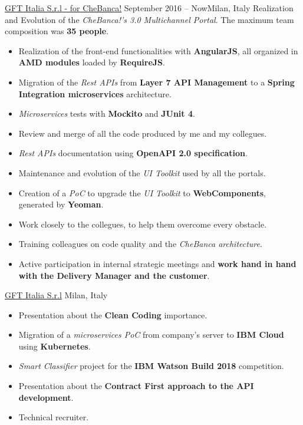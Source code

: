 \documentclass[10pt,a4paper]{altacv}
\begin{document}
\begin{adjustwidth}{0cm}{-8cm}
\divider

{\href{https://www.chebanca.it/}{GFT Italia S.r.l - for CheBanca!}}
{September 2016 -- Now}{Milan, Italy}
Realization and Evolution of the \textit{CheBanca!'s 3.0 Multichannel Portal}.
\newline
The maximum team composition was \textbf{35 people}.
\newline
\begin{itemize}
	\item Realization of the front-end functionalities with \textbf{AngularJS}, all organized in \textbf{AMD modules} loaded by \textbf{RequireJS}.
	\item Migration of the \textit{Rest APIs} from \textbf{Layer 7 API Management} to a \textbf{Spring Integration microservices} architecture.
	\item \textit{Microservices} tests with \textbf{Mockito} and \textbf{JUnit 4}.
	\item Review and merge of all the code produced by me and my collegues.
	\item \textit{Rest APIs} documentation using \textbf{OpenAPI 2.0 specification}.
	\item Maintenance and evolution of the \textit{UI Toolkit} used by all the portals.
	\item Creation of a \textit{PoC} to upgrade the \textit{UI Toolkit} to \textbf{WebComponents}, generated by \textbf{Yeoman}.
	\item Work closely to the collegues, to help them overcome every obstacle.
	\item Training colleagues on code quality and the \textit{CheBanca architecture}.
	\item Active participation in internal strategic meetings and \textbf{work hand in hand with the Delivery Manager and the customer}.
\end{itemize}

\divider

{\href{https://www.gft.com/it/it/index/}{GFT Italia S.r.l}}
{Milan, Italy}
\begin{itemize}
	\item Presentation about the \textbf{Clean Coding} importance.
	\item Migration of a \textit{microservices PoC} from company's server to \textbf{IBM Cloud} using \textbf{Kubernetes}.
	\item \textit{Smart Classifier} project for the \textbf{IBM Watson Build 2018} competition.
	\item Presentation about the \textbf{Contract First approach to the API development}.
	\item Technical recruiter.
\end{itemize}


\nocite{*}

\printbibliography[heading=pubtype,
title={\printinfo{\faBook}{\href{https://ilteoood.medium.com/}{Medium articles}}},
type=book]

\end{adjustwidth}
\end{document}
